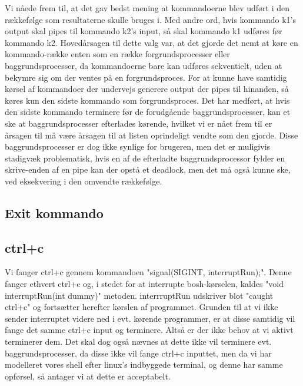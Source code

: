 \vspace{1cm}


Vi nåede frem til, at det gav bedst mening at kommandoerne blev udført i den rækkefølge som resultaterne skulle bruges i.
Med andre ord, hvis kommando k1's output skal pipes til kommando k2's input, så skal kommando k1 udføres før kommando k2.
Hovedårsagen til dette valg var, at det gjorde det nemt at køre en kommando-række enten som en række forgrundsprocesser eller baggrundsprocesser, da kommandoerne bare kan udføres sekventielt, uden at bekymre sig om der ventes på en forgrundsproces. For at kunne have samtidig kørsel af kommandoer der undervejs generere output der pipes til hinanden, så køres kun den sidste kommando som forgrundsproces. Det har medført, at hvis den sidste kommando terminere før de forudgående baggrundsprocesser, kan et ske at baggrundsprocesser efterlades kørende, hvilket vi er nået frem til er årsagen til må være årsagen til at listen oprindeligt vendte som den gjorde. Disse baggrundsprocesser er dog ikke synlige for brugeren, men det er muligivis stadigvæk problematisk, hvis en af de efterladte baggrundsprocessor fylder en skrive-enden af en pipe kan der opstå et deadlock, men det må også kunne ske, ved eksekvering i den omvendte rækkefølge.

\subsection{Exit kommando}
 
\subsection{ctrl+c}
Vi fanger ctrl+c gennem kommandoen "signal(SIGINT, interruptRun);". Denne fanger ethvert ctrl+c og, i stedet for at interrupte bosh-kørselen, kaldes "void interruptRun(int dummy)" metoden. interrruptRun udskriver blot "caught ctrl+c" og fortsætter herefter kørslen af programmet. Grunden til at vi ikke sender interruptet videre ned i evt. kørende programmer, er at disse samtidig vil fange det samme ctrl+c input og terminere. Altså er der ikke behov at vi aktivt terminerer dem. Det skal dog også nævnes at dette ikke vil terminere evt. baggrundsprocesser, da disse ikke vil fange ctrl+c inputtet, men da vi har modelleret vores shell efter linux's indbyggede terminal, og denne har samme opførsel, så antager vi at dette er acceptabelt. 

